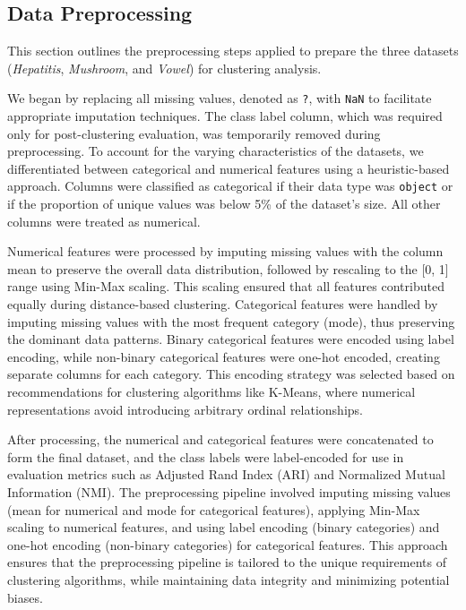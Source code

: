 \subsection{Data Preprocessing}
\label{subsec:preprocessing}

This section outlines the preprocessing steps applied to prepare the three datasets (\textit{Hepatitis}, \textit{Mushroom}, and \textit{Vowel}) for clustering analysis.

We began by replacing all missing values, denoted as \texttt{?}, with \texttt{NaN} to facilitate appropriate imputation techniques. The class label column, which was required only for post-clustering evaluation, was temporarily removed during preprocessing. To account for the varying characteristics of the datasets, we differentiated between categorical and numerical features using a heuristic-based approach. Columns were classified as categorical if their data type was \texttt{object} or if the proportion of unique values was below 5\% of the dataset's size. All other columns were treated as numerical.

Numerical features were processed by imputing missing values with the column mean to preserve the overall data distribution, followed by rescaling to the [0, 1] range using Min-Max scaling. This scaling ensured that all features contributed equally during distance-based clustering. Categorical features were handled by imputing missing values with the most frequent category (mode), thus preserving the dominant data patterns. Binary categorical features were encoded using label encoding, while non-binary categorical features were one-hot encoded, creating separate columns for each category. This encoding strategy was selected based on recommendations for clustering algorithms like K-Means, where numerical representations avoid introducing arbitrary ordinal relationships.

After processing, the numerical and categorical features were concatenated to form the final dataset, and the class labels were label-encoded for use in evaluation metrics such as Adjusted Rand Index (ARI) and Normalized Mutual Information (NMI). The preprocessing pipeline involved imputing missing values (mean for numerical and mode for categorical features), applying Min-Max scaling to numerical features, and using label encoding (binary categories) and one-hot encoding (non-binary categories) for categorical features. This approach ensures that the preprocessing pipeline is tailored to the unique requirements of clustering algorithms, while maintaining data integrity and minimizing potential biases.


